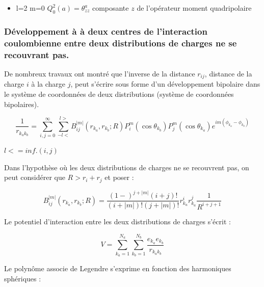 \begin{itemize}
	\item l=2 m=0 \hspace{1cm} $Q_{0}^{2}(a) = \theta_{zz}^{a}$ \hspace{1cm} composante $z$ de l'opérateur moment quadripolaire 
\end{itemize}

\subsubsection{Développement à à deux centres de l'interaction coulombienne entre deux distributions de charges ne se recouvrant pas.}

De nombreux travaux \cite{buehler1951bipolar,hylleraas1931elektronenterme,proctor1977long,davison1968atomic} ont montré que l'inverse de la distance $r_{ij}$, distance de la charge $i$ à la charge $j$, peut s'écrire sous forme d'un développement bipolaire dans le système de coordonnées de deux distributions (système de coordonnées bipolaires).
	
\begin{equation}
\frac{1}{r_{k_{a}k_{b}}} = \sum_{i,j=0}^{\infty} \sum_{-l<}^{l>} B_{ij}^{|m|}(r_{k_{a}}, r_{k_{b}}; R) P_{i}^{m} (\cos\theta_{k_{b}}) P_{j}^{m}(\cos\theta_{k_{a}}) e^{im(\phi_{k_{a}}-\phi_{k_{b}})}
\end{equation}
	
$l< = inf.(i,j)$
	
	
Dans l'hypothèse où les deux distributions de charges ne se recouvrent pas, on peut considérer que $R> r_{i} +r_{j}$ et poser : 
	
\begin{equation}
B_{ij}^{|m|}(r_{k_{a}}, r_{k_{b}}; R) = \frac{(1-)^{j+|m|} (i+j)!}{(i+|m|)! (j+|m|)!} r^{i}_{k_{a}} r_{k_{a}}^{j} \frac{1}{R^{i+j+1}}
\end{equation}
	
Le potentiel d'interaction entre les deux distributions de charges s'écrit : 
	
\begin{equation}
V = \sum_{k_{a}=1}^{N_{a}} \sum_{k_{b}=1}^{N_{b}} \frac{e_{k_{a}}e_{k_{b}}}{r_{k_{a}k_{b}}}
\end{equation}
	
	
Le polynôme associe de Legendre s'exprime en fonction des harmoniques sphériques : 
	
